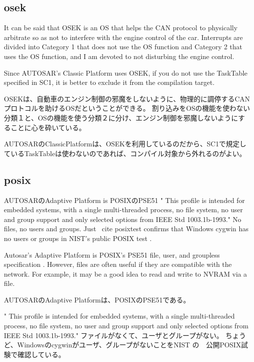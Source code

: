 \documentclass[twocolumn]{article} %
\begin{document}
\subsection{osek}
It can be said that OSEK is an OS that helps the CAN protocol to physically arbitrate so as not to interfere with the engine control of the car.
Interrupts are divided into Category 1 that does not use the OS function and Category 2 that uses the OS function, and I am devoted to not disturbing the engine control. \cite{osek}

Since AUTOSAR's Classic Platform uses OSEK, if you do not use the TaskTable specified in SC1, it is better to exclude it from the compilation target.

OSEKは、自動車のエンジン制御の邪魔をしないように、物理的に調停するCANプロトコルを助けるOSだということができる。
割り込みをOSの機能を使わない分類１と、OSの機能を使う分類２に分け、エンジン制御を邪魔しないようにすることに心を砕いている。\cite{osek}

AUTOSARのClassicPlatformは、OSEKを利用しているのだから、SC1で規定しているTaskTableは使わないのであれば、コンパイル対象から外れるのがよい。

\subsection{posix}
AUTOSARのAdaptive Platform is POSIXのPSE51\cite{posix}
" This profile is intended for embedded systems, with a single multi-threaded process, no file system, no user and group support and only selected options from IEEE Std 1003.1b-1993."
No files, no users and groups.
Just \ cite {posixtest} confirms that Windows cygwin has no users or groups in NIST's public POSIX test \cite{posixtestsuite}.

Autosar's Adaptive Platform is POSIX's PSE51 file, user, and groupless specification \cite{pse51}.
However, files are often useful if they are compatible with the network.
For example, it may be a good idea to read and write to NVRAM via a file. 

AUTOSARのAdaptive Platformは、POSIXのPSE51\cite{posix}である。

" This profile is intended for embedded systems, with a single multi-threaded process, no file system, no user and group support and only selected options from IEEE Std 1003.1b-1993."
ファイルがなくて、ユーザとグループがない。
ちょうど、Windowsのcygwinがユーザ、グループがないことをNIST の　公開POSIX試験\cite{posixtestsuite}で確認している\cite{posixtest}。
\end{document}
